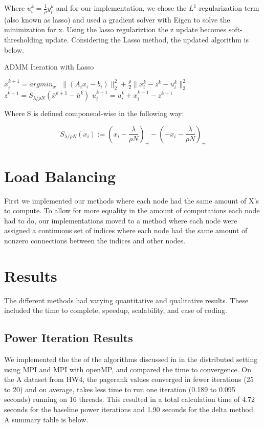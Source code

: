 \documentclass[letterpaper,12pt,onecolumn]{article}
\begin{document}
Where $u_{i}^{k} = \frac{1}{\rho} y_{i}^{k}$ and for our implementation, we chose the $L^{1}$ regularization term (also known as lasso) and used a gradient solver with Eigen to solve the minimization for x. Using the lasso regulariztion the z update becomes soft-thresholding update. Considering the Lasso method, the updated algorithm is below.

\begin{center}
\begin{algorithm}
\caption{ADMM Iteration with Lasso}
\begin{algorithmic}[1]
  \STATE $x_{i}^{k+1} = argmin_{x} \: \: \: \|(A_{i}x_{i} - b_{i})\|_{2}^{2} + \frac{\rho}{2} \| x_{i}^{k} - z^{k} - u_{i}^{k} \|_{2}^{2}$ 
  \STATE $z^{k+1} = S_{\lambda/\rho N} (\bar{x}^{k+1} - \bar{u}^{k})$
	\STATE $u_{i}^{k+1} = u_{i}^{k} + x_{i}^{k+1} - z^{k+1} $ 
  \end{algorithmic}
\end{algorithm}
\end{center}

Where S is defined componend-wise in the following way:
\begin{center}
	\begin{equation}
	  S_{\lambda/\rho N}(x_{i}) := (x_{i} - \frac{\lambda}{\rho N})_{+} - (-x_{i} - \frac{\lambda}{\rho N})_{+}
	\end{equation}
\end{center}

\section{Load Balancing}
First we implemented our methods where each node had the same amount of X's to compute. To allow for more equality in the amount of computations each node had to do, our implementations moved to a method where each node were assigned a continuous set of indices where each node had the same amount of nonzero connections between the indices and other nodes. 


\section{Results}
The different methods had varying quantitative and qualitative results. These included the time to complete, speedup, scalability, and ease of coding. 

\subsection{Power Iteration Results}
We implemented the the of the algorithms discussed in \cite{Joyce} in the distributed setting using MPI and MPI with openMP, and compared the time to convergence. On the A dataset from HW4, the pagerank values converged in fewer iterations (25 to 20) and on average, takes less time to run one iteration (0.189 to 0.095 seconds) running on 16 threads. This resulted in a total calculation time of 4.72 seconds for the baseline power iterations and 1.90 seconds for the delta method. A summary table is below.
\end{document}
